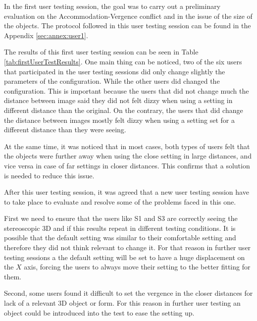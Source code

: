 \documentclass[10pt,a4paper,twocolumn,twoside]{article}
\begin{document}
	In the first user testing session, the goal was to carry out a preliminary evaluation on the Accommodation-Vergence conflict and in the issue of the size of the objects. The protocol followed in this user testing session can be found in the Appendix \ref{sec:annex:user1}.
	
	The results of this first user testing session can be seen in Table \ref{tab:firstUserTestResults}. One main thing can be noticed, two of the six users that participated in the user testing sessions did only change slightly the parameters of the configuration. 
	While the other users did changed the configuration. This is important because the users that did not change much the distance between image said they did not felt dizzy when using a setting in different distance than the original. On the contrary, the users that did change the distance between images mostly felt dizzy when using a setting set for a different distance than they were seeing.
	
	At the same time, it was noticed that in most cases, both types of users felt that the objects were further away when using the close setting in large distances, and vice versa in case of far settings in closer distances. This confirms that a solution is needed to reduce this issue. 
	
	After this user testing session, it was agreed that a new user testing session have to take place to evaluate and resolve some of the problems faced in this one. 

	First we need to ensure that the users like S1 and S3 are correctly seeing the stereoscopic 3D and if this results repeat in different testing conditions. It is possible that the default setting was similar to their comfortable setting and therefore they did not think relevant to change it. For that reason in further user testing sessions a the default setting will be set to have a huge displacement on the $X$ axis, forcing the users to always move their setting to the better fitting for them.
	
	Second, some users found it difficult to set the vergence in the closer distances for lack of a relevant 3D object or form. For this reason in further user testing an object could be introduced into the test to ease the setting up. 
	
	
	
\end{document}
